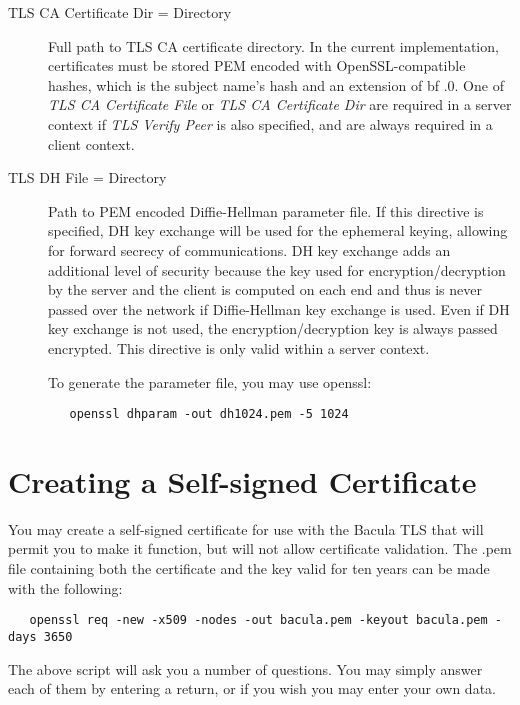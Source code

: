 \begin{description}
\item [TLS CA Certificate Dir = \lt{}Directory\gt{}]
Full path to TLS CA certificate directory.  In the current implementation,
certificates must be stored PEM encoded with OpenSSL-compatible hashes,
which is the subject name's hash and an extension of {bf .0}.
One of \emph{TLS CA Certificate File} or \emph{TLS CA Certificate Dir} are
required in a server context if \emph{TLS Verify Peer} is also specified,
and are always required in a client context.

\item [TLS DH File = \lt{}Directory\gt{}]
Path to PEM encoded Diffie-Hellman parameter file.  If this directive is
specified, DH key exchange will be used for the ephemeral keying, allowing
for forward secrecy of communications.  DH key exchange adds an additional
level of security because the key used for encryption/decryption by the
server and the client is computed on each end and thus is never passed over
the network if Diffie-Hellman key exchange is used.  Even if DH key
exchange is not used, the encryption/decryption key is always passed
encrypted.  This directive is only valid within a server context.

To generate the parameter file, you
may use openssl:

\begin{verbatim} 
   openssl dhparam -out dh1024.pem -5 1024 
\end{verbatim}

\end{description}

\section{Creating a Self-signed Certificate}

You may create a self-signed certificate for use with the Bacula TLS that
will permit you to make it function, but will not allow certificate
validation.  The .pem file containing both the certificate and the key
valid for ten years can be made with the following:

\footnotesize
\begin{verbatim}
   openssl req -new -x509 -nodes -out bacula.pem -keyout bacula.pem -days 3650
\end{verbatim}
\normalsize

The above script will ask you a number of questions. You may simply answer
each of them by entering a return, or if you wish you may enter your own data.

